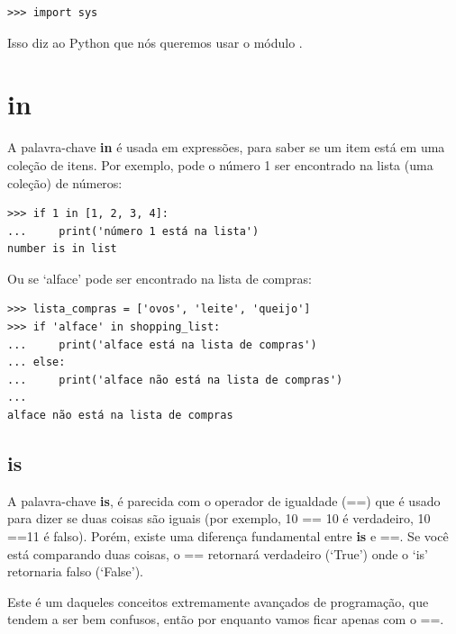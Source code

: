 \begin{listing}
\begin{verbatim}
>>> import sys
\end{verbatim}
\end{listing}

Isso diz ao Python que nós queremos usar o módulo .

\section*{in}

A palavra-chave \textbf{in} é usada em expressões, para saber se um item está em uma coleção de itens. Por exemplo, pode o número 1 ser encontrado na lista (uma coleção) de números:

\begin{listing}
\begin{verbatim}
>>> if 1 in [1, 2, 3, 4]:
...     print('número 1 está na lista')
number is in list
\end{verbatim}
\end{listing}

\noindent
Ou se `alface' pode ser encontrado na lista de compras:

\begin{listing}
\begin{verbatim}
>>> lista_compras = ['ovos', 'leite', 'queijo']
>>> if 'alface' in shopping_list:
...     print('alface está na lista de compras')
... else:
...     print('alface não está na lista de compras')
...
alface não está na lista de compras
\end{verbatim}
\end{listing}

\subsection*{is}

A palavra-chave \textbf{is}, é parecida com o operador de igualdade (==) que é usado para dizer se duas coisas são iguais (por exemplo, 10 == 10 é verdadeiro, 10 ==11 é falso). Porém, existe uma diferença fundamental entre \textbf{is} e ==. Se você está comparando duas coisas, o == retornará verdadeiro (`True') onde o `is' retornaria falso (`False').
\par
Este é um daqueles conceitos extremamente avançados de programação, que tendem a ser bem confusos, então por enquanto vamos ficar apenas com o ==.

